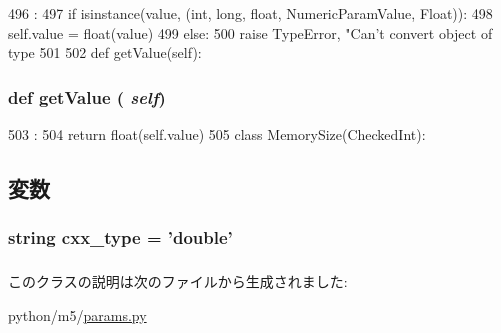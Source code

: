 \begin{DoxyCode}
496                              :
497         if isinstance(value, (int, long, float, NumericParamValue, Float)):
498             self.value = float(value)
499         else:
500             raise TypeError, "Can't convert object of type %
501                   %
502 
    def getValue(self):
\end{DoxyCode}
\hypertarget{classm5_1_1params_1_1Float_acc340fbd4335fa34f9d57fb454b28ed0}{
\subsubsection[{getValue}]{\setlength{\rightskip}{0pt plus 5cm}def getValue ( {\em self})}}
\label{classm5_1_1params_1_1Float_acc340fbd4335fa34f9d57fb454b28ed0}



\begin{DoxyCode}
503                       :
504         return float(self.value)
505 
class MemorySize(CheckedInt):
\end{DoxyCode}


\subsection{変数}
\hypertarget{classm5_1_1params_1_1Float_a2f1553ebb79374a68b36fdd6d8d82fc3}{
\subsubsection[{cxx\_\-type}]{\setlength{\rightskip}{0pt plus 5cm}string {\bf cxx\_\-type} = 'double'}}
\label{classm5_1_1params_1_1Float_a2f1553ebb79374a68b36fdd6d8d82fc3}
\hypertarget{classm5_1_1params_1_1Float_afcc7a4b78ecd8fa7e713f8cfa0f51017}{
\subsubsection[{value}]{}}
\label{classm5_1_1params_1_1Float_afcc7a4b78ecd8fa7e713f8cfa0f51017}


このクラスの説明は次のファイルから生成されました:\begin{DoxyCompactItemize}
\item 
python/m5/\hyperlink{params_8py}{params.py}\end{DoxyCompactItemize}
